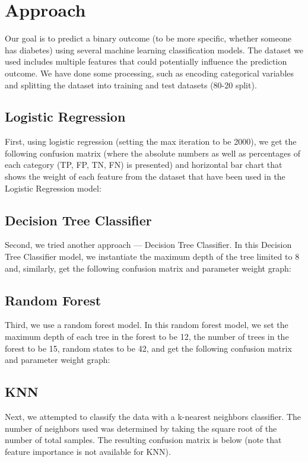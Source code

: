 \documentclass[12pt]{article}
\begin{document}
\section{Approach}
Our goal is to predict a binary outcome (to be more specific, whether someone has diabetes) using several machine learning classification models. The dataset we used includes multiple features that could potentially influence the prediction outcome. We have done some processing, such as  encoding categorical variables and splitting the dataset into training and test datasets (80-20 split). 

\subsection{Logistic Regression}
First, using  logistic regression (setting the max iteration to be 2000), we get the following confusion matrix (where the absolute numbers as well as percentages of each category (TP, FP, TN, FN) is presented) and horizontal bar chart that shows the weight of each feature from the dataset that have been used in the Logistic Regression model:

\subsection{Decision Tree Classifier}
Second, we tried another approach — Decision Tree Classifier. In this Decision Tree Classifier model, we instantiate the maximum depth of the tree limited to 8 and, similarly, get the following confusion matrix and parameter weight graph:

\subsection{Random Forest}
Third, we use a random forest model. In this random forest model, we set the maximum depth of each tree in the forest to be 12, the number of trees in the forest to be 15, random states to be 42, and get the following confusion matrix and parameter weight graph:

\subsection{KNN}
Next, we attempted to classify the data with a k-nearest neighbors classifier. The number of neighbors used was determined by taking the square root of the number of total samples. The resulting confusion matrix is below (note that feature importance is not available for KNN).
\end{document}
